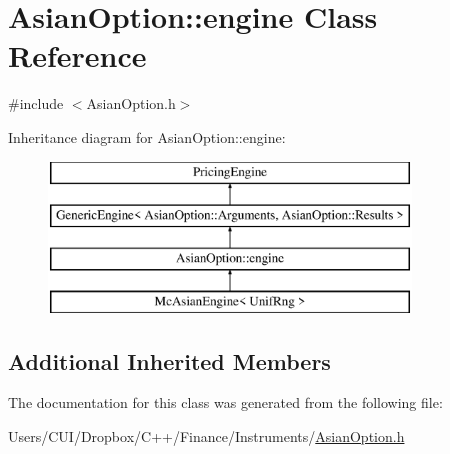 \hypertarget{class_asian_option_1_1engine}{}\section{Asian\+Option\+:\+:engine Class Reference}
\label{class_asian_option_1_1engine}


{\ttfamily \#include $<$Asian\+Option.\+h$>$}

Inheritance diagram for Asian\+Option\+:\+:engine\+:\begin{figure}[H]
\begin{center}
\leavevmode
\includegraphics[height=4.000000cm]{class_asian_option_1_1engine}
\end{center}
\end{figure}
\subsection*{Additional Inherited Members}


The documentation for this class was generated from the following file\+:\begin{DoxyCompactItemize}
\item 
Users/\+C\+U\+I/\+Dropbox/\+C++/\+Finance/\+Instruments/\hyperlink{_asian_option_8h}{Asian\+Option.\+h}\end{DoxyCompactItemize}

